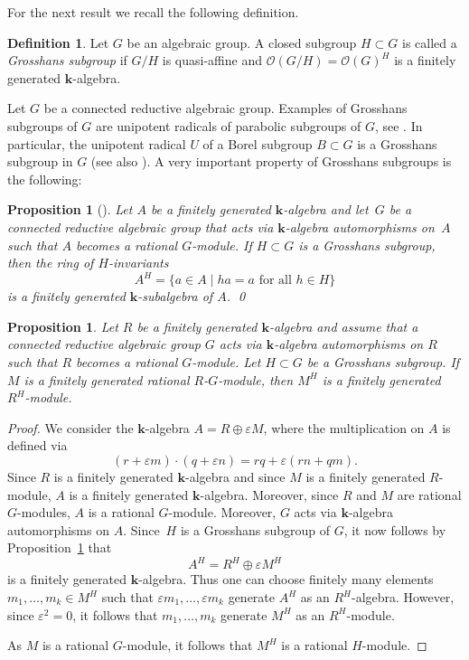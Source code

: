 \documentclass[JEP,XML,SOM,Unicode]{cedram}
\let\mathcal\mathscr
\theoremstyle{plain}
\newtheorem{proposition}[theorem]{Proposition}
\theoremstyle{definition}
\newtheorem{definition}[theorem]{Definition}
\newcommand{\OO}{\mathcal{O}}
\newcommand{\kk}{{\boldsymbol{k}}}
\newcommand{\set}[2]{\{#1 \mid #2\}}
\begin{document}
For the next result we recall the following definition.

\begin{definition}
Let $G$ be an algebraic group. A closed subgroup $H \subset G$
is called a \emph{Grosshans subgroup} if $G/H$ is quasi-affine and
$\OO(G/H) = \OO(G)^H$ is a finitely generated $\kk$-algebra.
\end{definition}

Let $G$ be a connected reductive algebraic group.
Examples of Grosshans subgroups of $G$ are unipotent radicals of parabolic
subgroups of $G$, see \cite[Th.\,16.4]{Gr1997Algebraic-homogene}.
In particular, the unipotent radical $U$ of a Borel subgroup
$B \subset G$ is a Grosshans subgroup in $G$
(see also \cite[Th.\,9.4]{Gr1997Algebraic-homogene}). A very important property of Grosshans subgroups is the following:

\begin{proposition}[{\cite[Th.\,9.3]{Gr1997Algebraic-homogene}}]
\label{prop:finite_generation_of_invariant}
Let $A$ be a finitely generated $\kk$-algebra and let~$G$
be a connected reductive algebraic group that acts via $\kk$-algebra automorphisms on~$A$
such that $A$ becomes a rational $G$-module.
If $H \subset G$ is a Grosshans subgroup, then the ring of $H$-invariants
\[
A^H = \set{a \in A}{\textrm{$h a = a$ for all $h \in H$}}
\]
is a finitely generated $\kk$-subalgebra of $A$. \qed
\end{proposition}

\begin{proposition}
\label{prop.MU_finitely_generated}
Let $R$ be a finitely generated $\kk$-algebra and assume
that a connected reductive algebraic group
$G$ acts via $\kk$-algebra automorphisms on $R$ such that
$R$ becomes a rational $G$-module. Let $H \subset G$ be a
Grosshans subgroup.
If $M$ is a finitely generated rational $R$-$G$-module,
then $M^H$ is a finitely generated $R^H$-module.
\end{proposition}

\begin{proof}
We consider the $\kk$-algebra $A = R \oplus \varepsilon M$, where the
multiplication on $A$ is defined via
\[
(r + \varepsilon m) \cdot (q + \varepsilon n) =
rq + \varepsilon (rn+qm).
\]
Since $R$ is a finitely generated $\kk$-algebra and since $M$
is a finitely generated $R$-module, $A$ is a finitely generated $\kk$-algebra.
Moreover, since $R$ and $M$ are rational $G$-modules,
$A$ is a rational $G$-module. Moreover,
$G$ acts via $\kk$-algebra automorphisms on $A$.
Since~$H$ is a Grosshans subgroup of $G$, it now follows
by Proposition~\ref{prop:finite_generation_of_invariant}
that
\[
A^H = R^H \oplus \varepsilon M^H
\]
is a finitely generated $\kk$-algebra. Thus one can choose
finitely many elements $m_1, \ldots, m_k \in M^H$
such that $\varepsilon m_1, \ldots, \varepsilon m_k$ generate $A^H$
as an $R^H$-algebra. However, since $\varepsilon^2 = 0$, it follows
that $m_1, \ldots, m_k$ generate $M^H$ as an $R^H$-module.

As $M$ is a rational $G$-module, it follows that $M^H$ is a rational $H$-module.
\end{proof}
\end{document}
